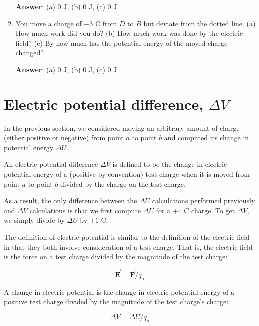 \documentclass{article}
\newcommand{\bfvec}[1]{\vec{\mathbf{#1}}}
\begin{document}
\begin{enumerate}
        \ifsolutions
        \textbf{Answer}: (a) $0\text{ J}$, (b) $0\text{ J}$, (c) $0\text{ J}$
        \else
        \vskip 48pt
        \fi

  \item You move a charge of $-3\text{ C}$ from $D$ to $B$ but deviate from the dotted line. (a) How much work did you do? (b) How much work was done by the electric field? (c) By how much has the potential energy of the moved charge changed?

        \ifsolutions
        \textbf{Answer}: (a) $0\text{ J}$, (b) $0\text{ J}$, (c) $0\text{ J}$
        \fi

\end{enumerate}

\newpage

\section{Electric potential difference, $\Delta V$}

In the previous section, we considered moving an arbitrary amount of charge (either positive or negative) from point $a$ to point $b$ and computed its change in potential energy $\Delta U$. 

An electric potential difference $\Delta V$ is defined to be the change in electric potential energy of a (positive by convention) test charge when it is moved from point $a$ to point $b$ divided by the charge on the test charge.

As a result, the only difference between the $\Delta U$ calculations performed previously and $\Delta V$ calculations is that we first compute $\Delta U$ for a $+1\text{ C}$ charge. To get $\Delta V$, we simply divide by $\Delta U$ by $+1\text{ C}$.

The definition of electric potential is similar to the definition of the electric field in that they both involve consideration of a test charge. That is, the electric field is the force on a test charge divided by the magnitude of the test charge:

\begin{equation}
\bfvec{E} = {\bfvec{F}}/{q_o}
\end{equation}

A change in electric potential is the change in electric potential energy of a positive test charge divided by the magnitude of the test charge's charge:

\begin{equation}
\Delta V = {\Delta U}/{q_o}
\end{equation}
\end{document}
